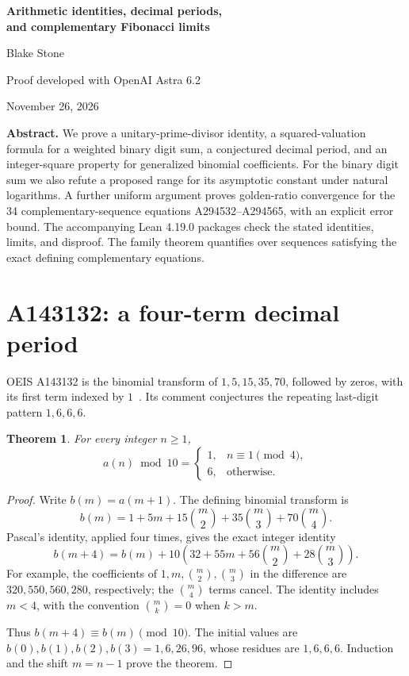 \documentclass[11pt]{article}
\newtheorem{theorem}{Theorem}[section]
\begin{document}
\begin{center}
{\LARGE\bfseries Arithmetic identities, decimal periods,\\[3pt]
and complementary Fibonacci limits}\par
\vspace{0.5em}
{\large Blake Stone}\par
Proof developed with OpenAI Astra 6.2\par
November 26, 2026
\end{center}

\textbf{Abstract.}
We prove a unitary-prime-divisor identity, a squared-valuation formula for a
weighted binary digit sum, a conjectured decimal period, and an
integer-square property for generalized binomial coefficients. For the binary
digit sum we also refute a proposed range for its asymptotic constant under
natural logarithms. A further uniform argument proves golden-ratio
convergence for the 34 complementary-sequence equations A294532--A294565,
with an explicit error bound. The accompanying Lean 4.19.0 packages check
the stated identities, limits, and disproof. The family theorem quantifies
over sequences satisfying the exact defining complementary equations.

\section{A143132: a four-term decimal period}

OEIS A143132 is the binomial transform of $1,5,15,35,70$, followed by zeros,
with its first term indexed by $1$~\cite{A143132}. Its comment conjectures
the repeating last-digit pattern $1,6,6,6$.

\begin{theorem}
For every integer $n\ge1$,
\[
 a(n)\bmod10=
 \begin{cases}1,&n\equiv1\pmod4,\\6,&\text{otherwise}.\end{cases}
\]
\end{theorem}
\begin{proof}
Write $b(m)=a(m+1)$. The defining binomial transform is
\[
 b(m)=1+5m+15\binom m2+35\binom m3+70\binom m4.
\]
Pascal's identity, applied four times, gives the exact integer identity
\begin{equation}
 b(m+4)=b(m)+10\left(32+55m+56\binom m2+28\binom m3\right).
 \label{eq:decimal}
\end{equation}
For example, the coefficients of $1,m,\binom m2,\binom m3$ in the
difference are $320,550,560,280$, respectively; the $\binom m4$ terms
cancel. The identity includes $m<4$, with the convention $\binom mk=0$
when $k>m$.

Thus $b(m+4)\equiv b(m)\pmod{10}$. The initial values are
$b(0),b(1),b(2),b(3)=1,6,26,96$, whose residues are $1,6,6,6$.
Induction and the shift $m=n-1$ prove the theorem.
\end{proof}
\end{document}
